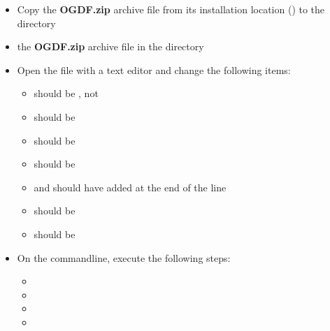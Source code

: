\begin{itemize}
\item Copy the \textbf{OGDF.zip} archive file from its installation location
() to the directory 
\item\exSp{} the \textbf{OGDF.zip} archive file in the directory
\item\exSp{}Open the file  with a text
editor and change the following items:
\begin{itemize}
\item {} should be , not 
\item\exSp{} should be
\item\exSp{} should be 
\item\exSp{} should be 
\item\exSp{} and  should have  added
at the end of the line
\item\exSp{} should be 
\item\exSp{} should be 
\end{itemize}
\item\exSp{}On the command\longDash{}line, execute the following steps:
\begin{itemize}
\item {}
\item\exSp{}
\item\exSp{}
\item\exSp{}
\end{itemize}
\end{itemize}
\tertiaryEnd
{}
